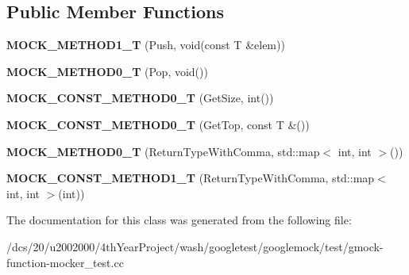 \subsection*{Public Member Functions}
\begin{DoxyCompactItemize}
\item 
\mbox{\label{classtesting_1_1gmock__function__mocker__test_1_1LegacyMockStack_a73aa854e9ff4381accbbe027c5f97031}} 
{\bfseries M\+O\+C\+K\+\_\+\+M\+E\+T\+H\+O\+D1\+\_\+T} (Push, void(const T \&elem))
\item 
\mbox{\label{classtesting_1_1gmock__function__mocker__test_1_1LegacyMockStack_ae787e4fd1cdc074b43414529d0ed8d88}} 
{\bfseries M\+O\+C\+K\+\_\+\+M\+E\+T\+H\+O\+D0\+\_\+T} (Pop, void())
\item 
\mbox{\label{classtesting_1_1gmock__function__mocker__test_1_1LegacyMockStack_ac53ce7a7345f2f1a1a7510243ad5e9f8}} 
{\bfseries M\+O\+C\+K\+\_\+\+C\+O\+N\+S\+T\+\_\+\+M\+E\+T\+H\+O\+D0\+\_\+T} (Get\+Size, int())
\item 
\mbox{\label{classtesting_1_1gmock__function__mocker__test_1_1LegacyMockStack_a7f11af583eafe9029fedbd82c76c848e}} 
{\bfseries M\+O\+C\+K\+\_\+\+C\+O\+N\+S\+T\+\_\+\+M\+E\+T\+H\+O\+D0\+\_\+T} (Get\+Top, const T \&())
\item 
\mbox{\label{classtesting_1_1gmock__function__mocker__test_1_1LegacyMockStack_a74246e67ad7ce096398908b4ac3bd980}} 
{\bfseries M\+O\+C\+K\+\_\+\+M\+E\+T\+H\+O\+D0\+\_\+T} (Return\+Type\+With\+Comma, std\+::map$<$ int, int $>$())
\item 
\mbox{\label{classtesting_1_1gmock__function__mocker__test_1_1LegacyMockStack_a369a6187b056292e185ba88622000e58}} 
{\bfseries M\+O\+C\+K\+\_\+\+C\+O\+N\+S\+T\+\_\+\+M\+E\+T\+H\+O\+D1\+\_\+T} (Return\+Type\+With\+Comma, std\+::map$<$ int, int $>$(int))
\end{DoxyCompactItemize}


The documentation for this class was generated from the following file\+:\begin{DoxyCompactItemize}
\item 
/dcs/20/u2002000/4th\+Year\+Project/wash/googletest/googlemock/test/gmock-\/function-\/mocker\+\_\+test.\+cc\end{DoxyCompactItemize}
